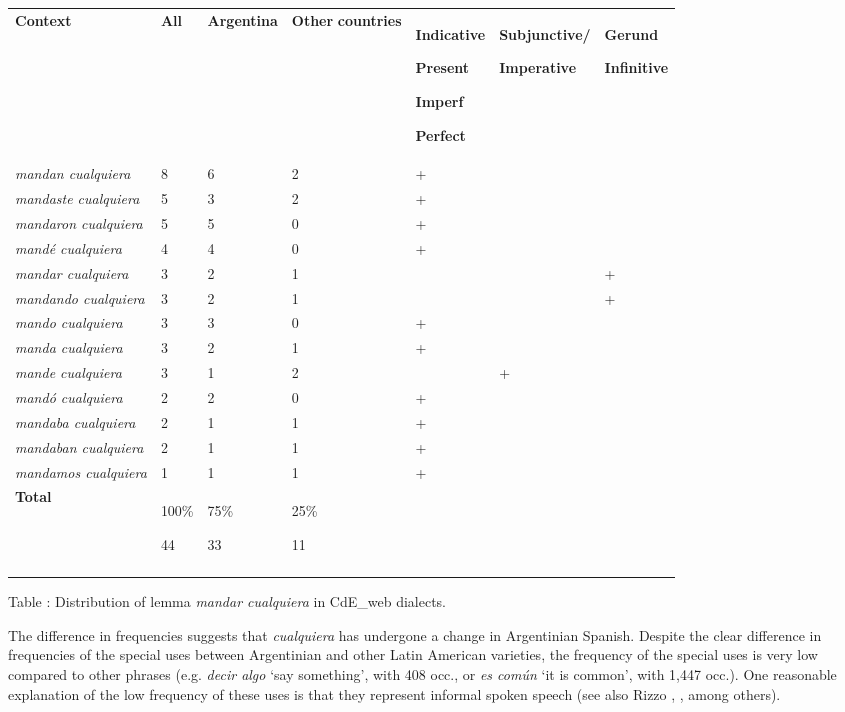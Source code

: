 \documentclass[output=paper]{langscibook}
\begin{document}
\begin{tabularx}{\textwidth}{XXXXXXX}

\lsptoprule

 \textbf{Context} & \textbf{All} & \textbf{Argentina} & \textbf{Other} \textbf{countries} & { \textbf{Indicative}}

{ \textbf{Present}}

{ \textbf{Imperf}}

 \textbf{Perfect} & { \textbf{Subjunctive/}}

 \textbf{Imperative} & { \textbf{Gerund}}

{ \textbf{Infinitive}}\\
 \textit{mandan cualquiera} & 8 & 6 & 2 & + &  & \\
 \textit{mandaste cualquiera} & 5 & 3 & 2 & + &  & \\
 \textit{mandaron cualquiera} & 5 & 5 & 0 & + &  & \\
 \textit{mandé cualquiera} & 4 & 4 & 0 & + &  & \\
 \textit{mandar cualquiera} & 3 & 2 & 1 &  &  & +\\
 \textit{mandando cualquiera} & 3 & 2 & 1 &  &  & +\\
 \textit{mando cualquiera} & 3 & 3 & 0 & + &  & \\
 \textit{manda cualquiera} & 3 & 2 & 1 & + &  & \\
 \textit{mande cualquiera} & 3 & 1 & 2 &  & + & \\
 \textit{mandó cualquiera} & 2 & 2 & 0 & + &  & \\
 \textit{mandaba cualquiera} & 2 & 1 & 1 & + &  & \\
 \textit{mandaban cualquiera} & 2 & 1 & 1 & + &  & \\
 \textit{mandamos cualquiera} & 1 & 1 & 1 & + &  & \\
 \textbf{Total} & { 100\%}

 44 & { 75\%}

 33 & { 25\%}

 11 &  &  & \\
\lspbottomrule
\end{tabularx}
\begin{styletablecaption}
Table : Distribution of lemma \textit{mandar cualquiera} in CdE\_web dialects.
\end{styletablecaption}

The difference in frequencies suggests that \textit{cualquiera} has undergone a change in Argentinian Spanish. Despite the clear difference in frequencies of the special uses between Argentinian and other Latin American varieties, the frequency of the special uses is very low compared to other phrases (e.g. \textit{decir algo} ‘say something’, with 408 occ., or \textit{es común} ‘it is common’, with 1,447 occ.). One reasonable explanation of the low frequency of these uses is that they represent informal spoken speech (see also Rizzo \citealt{Salierno2013}, \citealt{Conde2011}, among others). 
\end{document}
